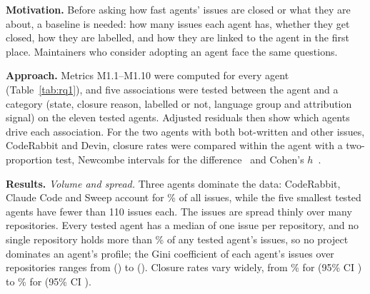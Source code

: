 \textbf{Motivation.} Before asking how fast agents' issues are closed or what they are about, a baseline is needed: how many issues each agent has, whether they get closed, how they are labelled, and how they are linked to the agent in the first place. Maintainers who consider adopting an agent face the same questions.

\textbf{Approach.} Metrics M1.1--M1.10 were computed for every agent (Table~\ref{tab:rq1}), and five associations were tested between the agent and a category (state, closure reason, labelled or not, language group and attribution signal) on the eleven tested agents. Adjusted residuals then show which agents drive each association. For the two agents with both bot-written and other issues, CodeRabbit and Devin, closure rates were compared within the agent with a two-proportion test, Newcombe intervals for the difference~\cite{newcombe1998interval} and Cohen's \(h\)~\cite{cohen1988power}.

\begin{table}[t]
\caption{Agent profile (RQ1). Closed, Labelled, Non-En.\ (not English) and Own bot are \% of the agent's issues; NP = closed as not planned, \% of closed issues}\label{tab:rq1}
\centering\footnotesize\setlength{\tabcolsep}{3pt}
\end{table}

\textbf{Results.} \emph{Volume and spread.} Three agents dominate the data: CodeRabbit, Claude Code and Sweep account for \TopThreeShare\% of all issues, while the five smallest tested agents have fewer than 110 issues each. The issues are spread thinly over many repositories. Every tested agent has a median of one issue per repository, and no single repository holds more than \TopRepoMax\% of any tested agent's issues, so no project dominates an agent's profile; the Gini coefficient of each agent's issues over repositories ranges from \GiniMin{} (\GiniMinAgent) to \GiniMax{} (\GiniMaxAgent). Closure rates vary widely, from \ClosedMin\% for \ClosedMinAgent{} (95\% CI \ClosedMinCI) to \ClosedMax\% for \ClosedMaxAgent{} (95\% CI \ClosedMaxCI).

